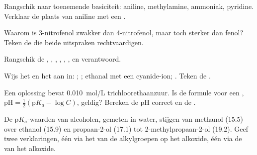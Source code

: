 \begin{exercise}[$\star\star$]\label{exo:b1:electronic-effects:6}
Rangschik naar toenemende basiciteit: aniline, methylamine, ammoniak,
pyridine. Verklaar de plaats van aniline met een .
\end{exercise}

\begin{exercise}[$\star\star$]\label{exo:b1:electronic-effects:7}
Waarom is 3-nitrofenol zwakker dan 4-nitrofenol, maar toch sterker dan
fenol? Teken de  die beide uitspraken
rechtvaardigen.
\end{exercise}

\begin{exercise}[$\star\star$]\label{exo:b1:electronic-effects:8}
Rangschik de  , , ,
, , , en verantwoord.
\end{exercise}

\begin{exercise}[$\star\star$]\label{exo:b1:electronic-effects:9}
Wijs het  en het  aan in: ;
; ethanal met een cyanide-ion; . Teken de
.
\end{exercise}

\begin{exercise}[$\star\star\star$]\label{exo:b1:electronic-effects:10}
Een oplossing bevat \qty{0.010}{mol/L} trichloorethaanzuur. Is de formule
voor een , $\mathrm{pH} = \frac12(\mathrm{p}K_a - \log C)$,
geldig? Bereken de pH correct en de .
\end{exercise}

\begin{exercise}[$\star\star\star$]\label{exo:b1:electronic-effects:11}
De $\mathrm{p}K_a$-waarden van alcoholen, gemeten in water, stijgen van
methanol (15.5) over ethanol (15.9) en propaan-2-ol (17.1) tot
2-methylpropaan-2-ol (19.2). Geef twee verklaringen, één via het
 van de alkylgroepen op het alkoxide, één via de
 van het alkoxide.
\end{exercise}



